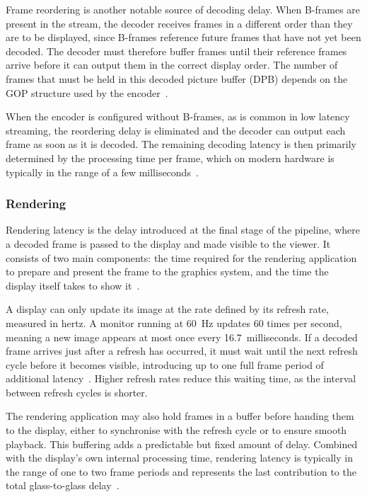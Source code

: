 Frame reordering is another notable source of decoding delay. When B-frames are present in the stream, the decoder receives frames in a different order than they are to be displayed, since B-frames reference future frames that have not yet been decoded. The decoder must therefore buffer frames until their reference frames arrive before it can output them in the correct display order. The number of frames that must be held in this decoded picture buffer (DPB) depends on the GOP structure used by the encoder~\cite{hamidouche2022}.
 
When the encoder is configured without B-frames, as is common in low latency streaming, the reordering delay is eliminated and the decoder can output each frame as soon as it is decoded. The remaining decoding latency is then primarily determined by the processing time per frame, which on modern hardware is typically in the range of a few milliseconds~\cite{axis2024}.

\subsubsection{Rendering}\label{subsec:rendering}
Rendering latency is the delay introduced at the final stage of the pipeline, where a decoded frame is passed to the display and made visible to the viewer. It consists of two main components: the time required for the rendering application to prepare and present the frame to the graphics system, and the time the display itself takes to show it~\cite{axis2024}.
 
A display can only update its image at the rate defined by its refresh rate, measured in hertz. A monitor running at 60~Hz updates 60 times per second, meaning a new image appears at most once every 16.7~milliseconds. If a decoded frame arrives just after a refresh has occurred, it must wait until the next refresh cycle before it becomes visible, introducing up to one full frame period of additional latency~\cite{leray2018}. Higher refresh rates reduce this waiting time, as the interval between refresh cycles is shorter.
 
The rendering application may also hold frames in a buffer before handing them to the display, either to synchronise with the refresh cycle or to ensure smooth playback. This buffering adds a predictable but fixed amount of delay. Combined with the display's own internal processing time, rendering latency is typically in the range of one to two frame periods and represents the last contribution to the total glass-to-glass delay~\cite{axis2024}.

